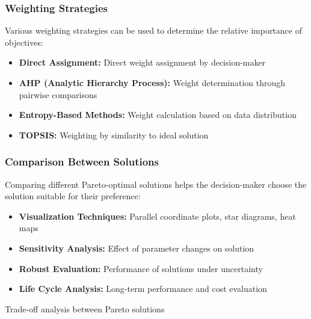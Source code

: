 \subsubsection{Weighting Strategies}
Various weighting strategies can be used to determine the relative importance of objectives:
\begin{itemize}
    \item \textbf{Direct Assignment:} Direct weight assignment by decision-maker
    \item \textbf{AHP (Analytic Hierarchy Process):} Weight determination through pairwise comparisons
    \item \textbf{Entropy-Based Methods:} Weight calculation based on data distribution
    \item \textbf{TOPSIS:} Weighting by similarity to ideal solution
\end{itemize}

\subsubsection{Comparison Between Solutions}
Comparing different Pareto-optimal solutions helps the decision-maker choose the solution suitable for their preference:
\begin{itemize}
    \item \textbf{Visualization Techniques:} Parallel coordinate plots, star diagrams, heat maps
    \item \textbf{Sensitivity Analysis:} Effect of parameter changes on solution
    \item \textbf{Robust Evaluation:} Performance of solutions under uncertainty
    \item \textbf{Life Cycle Analysis:} Long-term performance and cost evaluation
\end{itemize}

\begin{marginfigure}
\centering
{}
\caption{Trade-off analysis between Pareto solutions}
\end{marginfigure}

